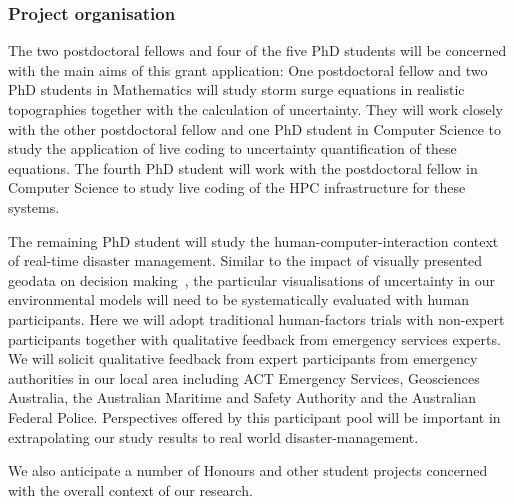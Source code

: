 \subsubsection*{Project organisation}

The two postdoctoral fellows and four of the five PhD students 
will be concerned with the main aims of this grant application: One postdoctoral fellow and two PhD students in 
Mathematics will study storm surge equations in realistic topographies together with the calculation of uncertainty. They will work closely with the other postdoctoral fellow 
and one PhD student in Computer Science to study the application of live coding to uncertainty quantification of these equations. The fourth
PhD student will work with the postdoctoral fellow in Computer Science to study live coding of the HPC infrastructure for these systems.

The remaining PhD student will study the human-computer-interaction context of real-time disaster management. 
Similar to the impact of visually presented geodata on decision
making~\parencite{kinkeldey2015evaluating}, the particular
visualisations of uncertainty in our environmental models will need to
be systematically evaluated with human participants. Here we will
adopt traditional human-factors trials with non-expert participants
together with qualitative feedback from emergency services experts. We
will solicit qualitative feedback from expert participants from
emergency authorities in our local area including ACT Emergency
Services, Geosciences Australia, the Australian Maritime and Safety
Authority and the Australian Federal Police. Perspectives offered by
this participant pool will be important in extrapolating our study
results to real world disaster-management.

We also anticipate a number of Honours and other student projects concerned with the overall context of our research.



 




